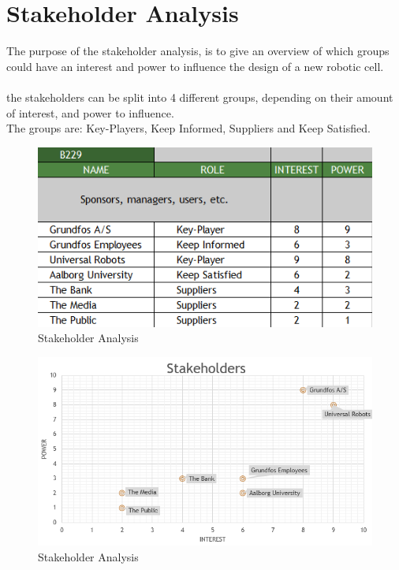 \chapter{Stakeholder Analysis} \label{ch:Stakeholder Analysis}

The purpose of the stakeholder analysis, is to give an overview of which groups could have an interest and power to influence the design of a new robotic cell.\\
\\
the stakeholders can be split into 4 different groups, depending on their amount of interest, and power to influence.\\
The groups are: Key-Players, Keep Informed, Suppliers and Keep Satisfied.\\

\begin{figure}[h]
    \centering
    \includegraphics[scale=0.65]{StakeholderAnalysis/Stake-Ranking.PNG}
    \caption{Stakeholder Analysis} 
    \label{fig:Stakeholder-ranking} 
\end{figure}
\newpage
\begin{figure}[h]
    \centering
    \includegraphics[scale=0.65]{StakeholderAnalysis/Stake-Graph.PNG}
    \caption{Stakeholder Analysis} 
    \label{fig:Stakeholder-graph} 
\end{figure}

